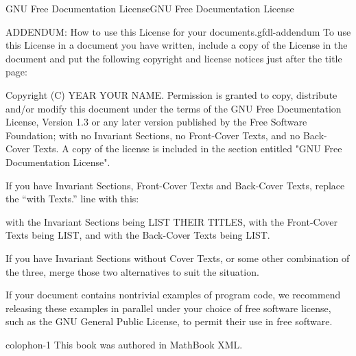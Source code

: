 \documentclass[10pt,]{book}
\numberwithin{equation}{section}
\begin{document}
\begin{appendixptx}{GNU Free Documentation License}{}{GNU Free Documentation License}{}{}
\begin{paragraphs}{ADDENDUM: How to use this License for your documents.}{gfdl-addendum}%
\hypertarget{p-1369}{}%
To use this License in a document you have written, include a copy of the License in the document and put the following copyright and license notices just after the title page:%
\begin{preformatted}
Copyright (C)  YEAR  YOUR NAME.
Permission is granted to copy, distribute and/or modify this document
under the terms of the GNU Free Documentation License, Version 1.3
or any later version published by the Free Software Foundation;
with no Invariant Sections, no Front-Cover Texts, and no Back-Cover Texts.
A copy of the license is included in the section entitled "GNU
Free Documentation License".
\end{preformatted}
\hypertarget{p-1370}{}%
If you have Invariant Sections, Front-Cover Texts and Back-Cover Texts, replace the ``with\textellipsis{} Texts.'' line with this:%
\begin{preformatted}
with the Invariant Sections being LIST THEIR TITLES, with the
Front-Cover Texts being LIST, and with the Back-Cover Texts being LIST.
\end{preformatted}
\hypertarget{p-1371}{}%
If you have Invariant Sections without Cover Texts, or some other combination of the three, merge those two alternatives to suit the situation.%
\par
\hypertarget{p-1372}{}%
If your document contains nontrivial examples of program code, we recommend releasing these examples in parallel under your choice of free software license, such as the GNU General Public License, to permit their use in free software.%
\end{paragraphs}%
\end{appendixptx}
%
\backmatter
%
%
\printindex
%
\cleardoublepage
\pagestyle{empty}
\begin{backcolophon}{colophon-1}%
\hypertarget{p-1373}{}%
This book was authored in MathBook XML.%
\end{backcolophon}%
\end{document}
